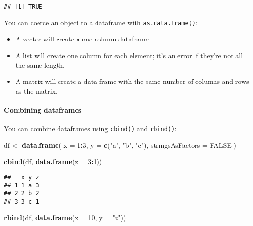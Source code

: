 \documentclass[
]{book}
\newenvironment{Shaded}{\begin{snugshade}}{\end{snugshade}}
\newcommand{\DataTypeTok}[1]{\textcolor[rgb]{0.13,0.29,0.53}{#1}}
\newcommand{\DecValTok}[1]{\textcolor[rgb]{0.00,0.00,0.81}{#1}}
\newcommand{\KeywordTok}[1]{\textcolor[rgb]{0.13,0.29,0.53}{\textbf{#1}}}
\newcommand{\NormalTok}[1]{#1}
\newcommand{\OperatorTok}[1]{\textcolor[rgb]{0.81,0.36,0.00}{\textbf{#1}}}
\newcommand{\OtherTok}[1]{\textcolor[rgb]{0.56,0.35,0.01}{#1}}
\newcommand{\StringTok}[1]{\textcolor[rgb]{0.31,0.60,0.02}{#1}}
\begin{document}
\begin{verbatim}
## [1] TRUE
\end{verbatim}

You can coerce an object to a dataframe with \texttt{as.data.frame()}:

\begin{itemize}
\item
  A vector will create a one-column dataframe.
\item
  A list will create one column for each element; it's an error if they're
  not all the same length.
\item
  A matrix will create a data frame with the same number of columns and rows as the matrix.
\end{itemize}

\hypertarget{combining-dataframes}{%
\paragraph{Combining dataframes}\label{combining-dataframes}}

You can combine dataframes using \texttt{cbind()} and \texttt{rbind()}:

\begin{Shaded}
\begin{Highlighting}[]
\NormalTok{df \textless{}{-}}\StringTok{ }\KeywordTok{data.frame}\NormalTok{(}
  \DataTypeTok{x =} \DecValTok{1}\OperatorTok{:}\DecValTok{3}\NormalTok{,}
  \DataTypeTok{y =} \KeywordTok{c}\NormalTok{(}\StringTok{"a"}\NormalTok{, }\StringTok{"b"}\NormalTok{, }\StringTok{"c"}\NormalTok{),}
  \DataTypeTok{stringsAsFactors =} \OtherTok{FALSE}
\NormalTok{)}

\KeywordTok{cbind}\NormalTok{(df, }\KeywordTok{data.frame}\NormalTok{(}\DataTypeTok{z =} \DecValTok{3}\OperatorTok{:}\DecValTok{1}\NormalTok{))}
\end{Highlighting}
\end{Shaded}

\begin{verbatim}
##   x y z
## 1 1 a 3
## 2 2 b 2
## 3 3 c 1
\end{verbatim}

\begin{Shaded}
\begin{Highlighting}[]
\KeywordTok{rbind}\NormalTok{(df, }\KeywordTok{data.frame}\NormalTok{(}\DataTypeTok{x =} \DecValTok{10}\NormalTok{, }\DataTypeTok{y =} \StringTok{"z"}\NormalTok{))}
\end{Highlighting}
\end{Shaded}
\end{document}

